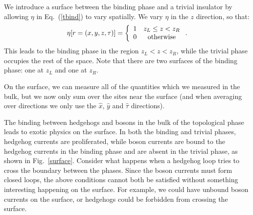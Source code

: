 \documentclass[prb,twocolumn]{revtex4-1}
\begin{document}
We introduce a surface between the binding phase and a trivial insulator by allowing $\eta$ in Eq.~(\ref{tbind}) to vary spatially.
We vary $\eta$ in the $z$ direction, so that:
\begin{equation}
\eta[r=(x,y,z,\tau)]=
\left\{ \begin{array}{cc}
1 & z_L\leq z<z_R\\
0 & \rm{otherwise}\\
\end{array}\right..
\label{eta_r}
\end{equation}
This leads to the binding phase in the region $z_L < z < z_R$, while the trivial phase occupies the rest of the space. Note that there are two surfaces of the binding phase: one at $z_L$ and one at $z_R$.

On the surface, we can measure all of the quantities which we measured in the bulk, but we now only sum over the sites near the surface (and when averaging over directions we only use the $\hat{x}$, $\hat{y}$ and $\hat{\tau}$ directions). 

The binding between hedgehogs and bosons in the bulk of the topological phase leads to exotic physics on the surface. In both the binding and trivial phases, hedgehog currents are proliferated, while boson currents are bound to the hedgehog currents in the binding phase and are absent in the trivial phase, as shown in Fig.~\ref{surface}. Consider what happens when a hedgehog loop tries to cross the boundary between the phases. Since the boson currents must form closed loops, the above conditions cannot both be satisfied without something interesting happening on the surface. For example, we could have unbound boson currents on the surface, or hedgehogs could be forbidden from crossing the surface.
\end{document}
